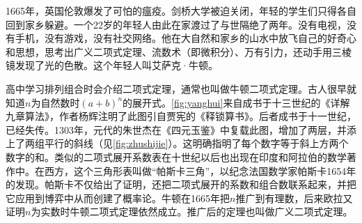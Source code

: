 \documentclass[b5paper]{ctexart}
\begin{document}
1665年，英国伦敦爆发了可怕的瘟疫。剑桥大学被迫关闭，年轻的学生们只得各自回到家乡躲避。一个22岁的年轻人由此在家渡过了与世隔绝了两年。没有电视，没有手机，没有游戏，没有社交网络。他在大自然和家乡的山水中放飞自己的好奇心和思想，思考出广义二项式定理、流数术（即微积分）、万有引力，还动手用三棱镜发现了光的色散。这个年轻人叫艾萨克·牛顿。

高中学习排列组合时会介绍二项式定理，通常也叫做牛顿二项式定理。古人很早就知道$n$为自然数时$(a + b)^n$的展开式。\cref{fig:yanghui}来自成书于十三世纪的《详解九章算法》，作者杨辉注明了此图引自贾宪的《释锁算书》。后者成书于十一世纪，已经失传。1303年，元代的朱世杰在《四元玉鉴》中复载此图，增加了两层，并添上了两组平行的斜线（见\cref{fig:zhushijie}）。这明确指明了每个数字等于斜上方两个数字的和。类似的二项式展开系数表在十世纪以后也出现在印度和阿拉伯的数学著作中。在西方，这个三角形表叫做“帕斯卡三角”，以纪念法国数学家帕斯卡1654年的发现。帕斯卡不仅给出了证明，还把二项式展开的系数和组合数联系起来，并把它应用到博弈中从而创建了概率论。牛顿在1665年把$n$推广到有理数，后来欧拉又证明$n$为实数时牛顿二项式定理依然成立。推广后的定理也叫做广义二项式定理。

\begin{figure}[htbp]
 \centering
  \qquad
\end{figure}
\end{document}

